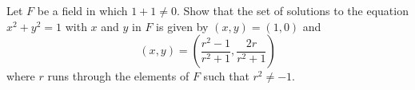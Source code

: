 Let $F$ be a field in which $1+1 \neq 0$. Show that the set of
solutions to the equation $x^2+y^2=1$ with $x$ and $y$ in $F$ is given
by $(x,y)=(1,0)$ and
\[
(x,y) = \left( \frac{r^2-1}{r^2+1}, \frac{2r}{r^2+1} \right)
\]
where $r$ runs through the elements of $F$ such that $r^2\neq -1$.

